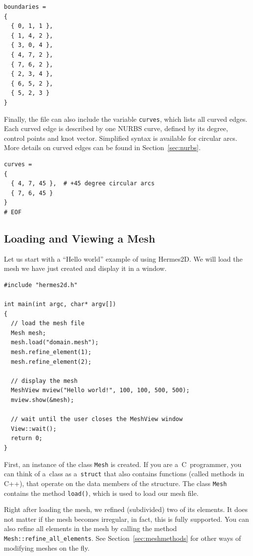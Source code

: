 \begin{lstlisting}
boundaries =
{
  { 0, 1, 1 },
  { 1, 4, 2 },
  { 3, 0, 4 },
  { 4, 7, 2 },
  { 7, 6, 2 },
  { 2, 3, 4 },
  { 6, 5, 2 },
  { 5, 2, 3 }
}
\end{lstlisting}

Finally, the file can also include the variable {\tt curves}, which lists all curved edges.
Each curved edge is described by one NURBS curve, defined by its degree, control points and
knot vector. Simplified syntax is available for circular arcs.
More details on curved edges can be found in
Section~\ref{sec:nurbs}.

\begin{lstlisting}
curves =
{
  { 4, 7, 45 },  # +45 degree circular arcs
  { 7, 6, 45 }
}
# EOF
\end{lstlisting}



\subsection{Loading and Viewing a Mesh}

Let us start with a ``Hello world'' example of using Hermes2D. We will load the mesh
we have just created and display it in a window.

\lstset{language=C++}
\begin{lstlisting}
#include "hermes2d.h"

int main(int argc, char* argv[])
{
  // load the mesh file
  Mesh mesh;
  mesh.load("domain.mesh");
  mesh.refine_element(1);
  mesh.refine_element(2);

  // display the mesh
  MeshView mview("Hello world!", 100, 100, 500, 500);
  mview.show(&mesh);

  // wait until the user closes the MeshView window
  View::wait();
  return 0;
}
\end{lstlisting}

First, an instance of the class {\tt Mesh} is created. If you are
a~C~programmer, you can think of a~class as a~{\tt struct} that also contains functions
(called methods in C++), that operate on the data members of the structure.
The class {\tt Mesh} contains the method {\tt load()}, which is used to load our mesh file.

Right after loading the mesh, we refined (subdivided) two of its elements. It does not
matter if the mesh becomes irregular, in fact, this is fully supported. You can also
refine all elements in the mesh by calling the method \verb"Mesh::refine_all_elements".
See Section~\ref{sec:meshmethods} for other ways of modifying meshes on the fly.

